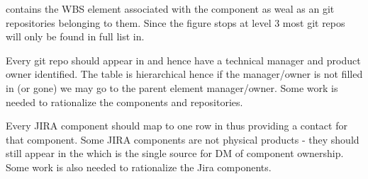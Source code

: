  contains the WBS element associated with the component as weal as an git repositories belonging to them.
 Since the figure stops at level 3 most git repos will only be found in full list in.

 Every git repo should appear in   and hence have a technical manager and product owner identified. The table is hierarchical hence if the manager/owner is not filled in (or gone) we may go to the parent element manager/owner. Some work is needed to rationalize the components and repositories. 

 Every JIRA component should map to one row in  thus providing a contact for that component.
 Some JIRA components are not physical products - they should still appear in the  which is the single source for DM of component  ownership. Some work is also needed to rationalize the Jira components.
